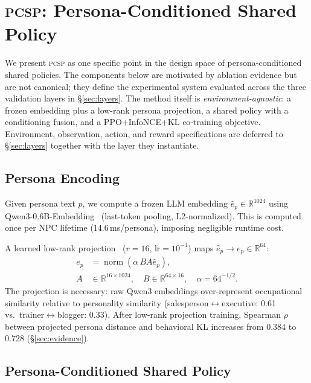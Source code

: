 \documentclass[conference]{IEEEtran}
\newcommand{\PCSP}{\textsc{pcsp}\xspace}
\begin{document}
\section{\PCSP{}: Persona-Conditioned Shared Policy}
\label{sec:method}

We present \PCSP as one specific point in the design space of persona-conditioned
shared policies. The components below are motivated by ablation evidence
but are not canonical; they define the experimental system evaluated across the
three validation layers in \S\ref{sec:layers}. The method itself is
\emph{environment-agnostic}: a frozen embedding plus a low-rank persona projection,
a shared policy with a conditioning fusion, and a PPO+InfoNCE+KL co-training
objective. Environment, observation, action, and reward specifications are
deferred to \S\ref{sec:layers} together with the layer they instantiate.

\subsection{Persona Encoding}

Given persona text $p$, we compute a frozen LLM embedding
$\hat{e}_p \in \mathbb{R}^{1024}$ using Qwen3-0.6B-Embedding~\cite{qwen3embed}
(last-token pooling, L2-normalized).
This is computed once per NPC lifetime (14.6\,ms/persona), imposing negligible
runtime cost.

A learned low-rank projection~\cite{hu2022lora} ($r\!=\!16$,
$\text{lr}\!=\!10^{-4}$) maps $\hat{e}_p \to e_p \in \mathbb{R}^{64}$:
\[
\begin{aligned}
  e_p &= \operatorname{norm}\!\left(\alpha\, B A \hat{e}_p\right), \\
  A &\in \mathbb{R}^{16\times1024},\quad
  B \in \mathbb{R}^{64\times16},\quad
  \alpha = 64^{-1/2}.
\end{aligned}
\]
The projection is necessary: raw Qwen3 embeddings over-represent occupational
similarity relative to personality similarity (salesperson$\leftrightarrow$executive:
0.61 vs.\ trainer$\leftrightarrow$blogger: 0.33).
After low-rank projection training, Spearman $\rho$ between projected persona
distance and behavioral KL increases from 0.384 to 0.728
(\S\ref{sec:evidence}).

\subsection{Persona-Conditioned Shared Policy}
\end{document}
